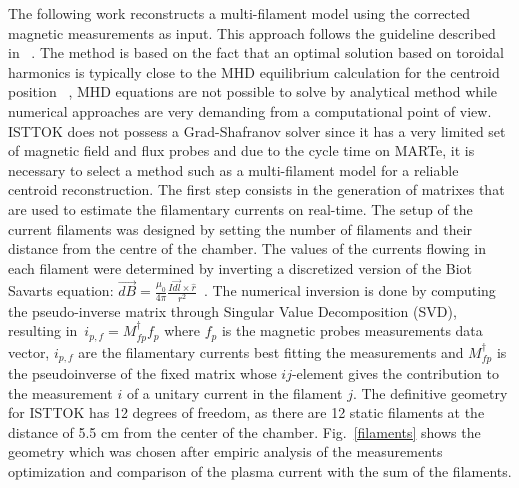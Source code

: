 The following work reconstructs a multi-filament model using the corrected magnetic measurements as input. This approach follows the guideline described in ~\cite[Chapter~3]{PirontiBook}. The method is based on the fact that an optimal solution based on toroidal harmonics is typically close to the MHD equilibrium calculation for the centroid position ~\cite[Chapter~3]{PirontiBook}, MHD equations are not possible to solve by analytical method while numerical approaches are very demanding from a computational point of view. ISTTOK does not possess a Grad-Shafranov solver since it  has a very limited set of magnetic field and flux probes and due to the cycle time on MARTe, it is necessary to select a method such as a multi-filament model for a reliable centroid reconstruction.  The first step consists in the generation of  matrixes that are used to estimate the filamentary currents on real-time. The setup of the current filaments was designed by setting the number of filaments and their distance from the centre of the chamber. The values of the currents flowing in each filament were determined by inverting a discretized version of the Biot Savart\textquotesingle s equation: $ \Vec{dB}=\frac{\mu_0}{4\pi}\frac{I\Vec{dl}\times \hat{r}}{r^2} \,$ . The numerical inversion is done by computing the pseudo-inverse matrix through Singular Value Decomposition (SVD), resulting in  $\, i_{p,f}=M^{\dagger}_{fp}f_p$ where $f_{p}$ is the  magnetic probes measurements data vector, $i_{p,f}$ are the  filamentary currents best fitting the measurements and $M^{\dagger}_{fp}$ is the pseudoinverse of the fixed matrix whose $ij$-element gives the contribution to the measurement  $i$ of a unitary current in the filament $j$. The definitive geometry for ISTTOK has 12 degrees of freedom, as there are 12 static filaments at the distance of 5.5 cm from the center of the chamber. Fig.~\ref{filaments} shows the geometry  which was chosen  after  empiric  analysis  of  the  measurements  optimization  and comparison  of  the  plasma  current  with  the  sum  of  the  filaments.




